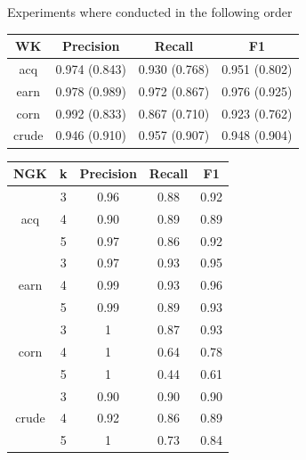 Experiments where conducted in the following order


\begin{tabular}{| c | c | c | c | } \hline
	 WK  & Precision & Recall & F1   \\ \hline	
	 acq &  0.974 (0.843) & 0.930 (0.768) & 0.951 (0.802) \\ \hline
	 earn &   0.978 (0.989)& 0.972 (0.867)& 0.976 (0.925)  \\ \hline
	 corn &   0.992 (0.833) & 0.867 (0.710) &  0.923 (0.762) \\ \hline
	 crude &   0.946 (0.910) & 0.957 (0.907) &  0.948 (0.904) \\ \hline
	
\end{tabular}

\begin{tabular}{| c | c | c | c | c | }\hline
	NGK & k & Precision & Recall & F1   \\ \hline	
	 & 3 & 0.96 & 0.88 & 0.92     \\ 
	acq & 4 & 0.90 & 0.89 &  0.89    \\
	 & 5 & 0.97 & 0.86 & 0.92     \\ \hline
	 & 3 & 0.97 & 0.93 &  0.95    \\ 
	earn & 4 & 0.99 & 0.93 &  0.96    \\ 
	 & 5 & 0.99 & 0.89 &  0.93    \\ \hline
	 & 3 & 1 & 0.87 & 0.93     \\ 
	corn & 4 & 1 & 0.64 & 0.78     \\ 
	 & 5 & 1 & 0.44 &  0.61    \\ \hline
	 & 3 & 0.90 & 0.90 &  0.90    \\ 
	crude & 4 & 0.92 & 0.86 & 0.89     \\ 
	 & 5 & 1 & 0.73 &  0.84    \\ \hline
\end{tabular}


